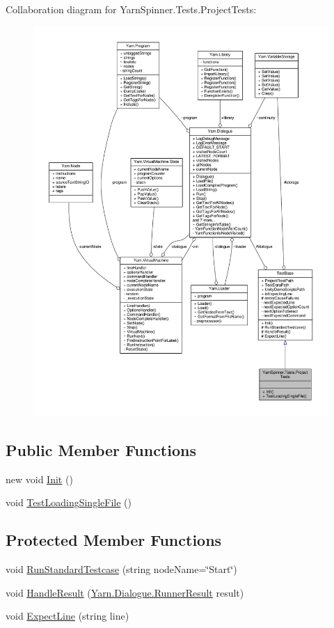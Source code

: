 Collaboration diagram for Yarn\-Spinner.\-Tests.\-Project\-Tests\-:
\nopagebreak
\begin{figure}[H]
\begin{center}
\leavevmode
\includegraphics[width=350pt]{a00732}
\end{center}
\end{figure}
\subsection*{Public Member Functions}
\begin{DoxyCompactItemize}
\item 
new void \hyperlink{a00141_a09fb3b241843b94176be710e4a2a6833}{Init} ()
\item 
void \hyperlink{a00141_a7d3dccb3f5ddf0b24e65782b7af15369}{Test\-Loading\-Single\-File} ()
\end{DoxyCompactItemize}
\subsection*{Protected Member Functions}
\begin{DoxyCompactItemize}
\item 
void \hyperlink{a00154_abffa134d40d72b21e6b35c3bf05fc53f}{Run\-Standard\-Testcase} (string node\-Name=\char`\"{}Start\char`\"{})
\item 
void \hyperlink{a00154_a7b525f85a26d7c942e1cbfa5d6453893}{Handle\-Result} (\hyperlink{a00143}{Yarn.\-Dialogue.\-Runner\-Result} result)
\item 
void \hyperlink{a00154_ac21a5082ddac1da9db17ae54038df44e}{Expect\-Line} (string line)
\end{DoxyCompactItemize}
